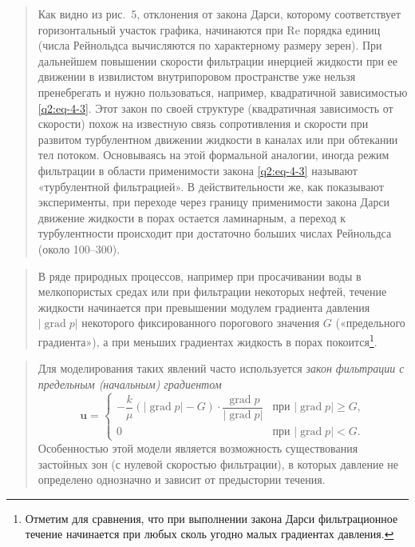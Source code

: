 \documentclass[12pt,a4paper]{article}
\DeclareMathOperator{\grad}{grad}
\newcommand{\Rey}{\mathrm{Re}}
\newenvironment{textquote}{\begin{quote}\sloppy}{\end{quote}}
\begin{document}
\begin{textquote}
Как видно из рис.~5, отклонения от закона Дарси, которому соответствует горизонтальный участок графика, начинаются при $\Rey$ порядка единиц (числа Рейнольдса вычисляются по характерному размеру зерен). При дальнейшем повышении скорости фильтрации инерцией жидкости при ее движении в извилистом внутрипоровом пространстве уже нельзя пренебрегать и нужно пользоваться, например, квадратичной зависимостью \eqref{q2:eq-4-3}. Этот закон по своей структуре (квадратичная зависимость от скорости) похож на известную связь сопротивления и скорости при развитом турбулентном движении жидкости в каналах или при обтекании тел потоком. Основываясь на этой формальной аналогии, иногда режим фильтрации в области применимости закона \eqref{q2:eq-4-3} называют «турбулентной фильтрацией». В действительности же, как показывают эксперименты, при переходе через границу применимости закона Дарси движение жидкости в порах остается ламинарным, а переход к турбулентности происходит при достаточно больших числах Рейнольдса (около 100--300).
\end{textquote}

\begin{textquote}
В ряде природных процессов, например при просачивании воды в мелкопористых средах или при фильтрации некоторых нефтей, течение жидкости начинается при превышении модулем градиента давления $|\grad p|$ некоторого фиксированного порогового
значения $G$ («предельного градиента»), а при меньших градиентах жидкость в порах покоится\footnote[1]{Отметим для сравнения, что при выполнении закона Дарси фильтрационное течение начинается при любых сколь угодно малых градиентах давления.}.
\end{textquote}

\begin{textquote}
Для моделирования таких явлений часто используется \textit{закон фильтрации с предельным (начальным) градиентом}
\begin{equation}
\boldsymbol{u}=\begin{cases}
-\dfrac{k}{\mu}(|\grad p|-G)\cdot\dfrac{\grad p}{|\grad p|}&\text{при }|\grad p|\geqslant G,\\[6pt]
0&\text{при }|\grad p|<G.
\end{cases}
\tag{4.4}\label{q2:eq-4-4}
\end{equation}
Особенностью этой модели является возможность существования застойных зон (с нулевой скоростью фильтрации), в которых давление не определено однозначно и зависит от предыстории течения.
\end{textquote}
\end{document}
